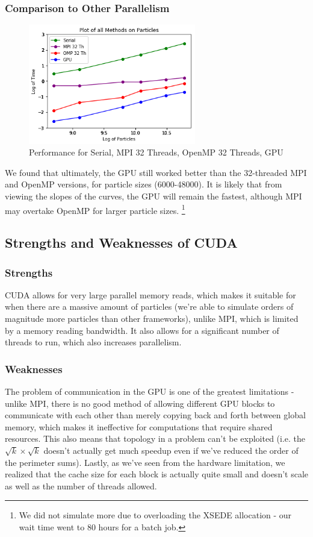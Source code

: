\documentclass[12pt]{article}
\begin{document}
\subsubsection{Comparison to Other Parallelism}

\begin{figure}[h]
  \caption{Performance for Serial, MPI 32 Threads, OpenMP 32 Threads, GPU}
  \centering 
  \includegraphics[width = 0.65\textwidth]{serial_mpi_openmp_gpu.png}
\end{figure}
We found that ultimately, the GPU still worked better than the 32-threaded MPI and OpenMP versions, for particle sizes (6000-48000). It is likely that from viewing the slopes of the curves, the GPU will remain the fastest, although MPI may overtake OpenMP for larger particle sizes. \footnote{We did not simulate more due to overloading the XSEDE allocation - our wait time went to 80 hours for a batch job.}

\subsection{Strengths and Weaknesses of CUDA}
\subsubsection{Strengths}
CUDA allows for very large parallel memory reads, which makes it suitable for when there are a massive amount of particles (we're able to simulate orders of magnitude more particles than other frameworks), unlike MPI, which is limited by a memory reading bandwidth. It also allows for a significant number of threads to run, which also increases parallelism. 


\subsubsection{Weaknesses}
The problem of communication in the GPU is one of the greatest limitations - unlike MPI, there is no good method of allowing different GPU blocks to communicate with each other than merely copying back and forth between global memory, which makes it ineffective for computations that require shared resources. This also means that topology in a problem can't be exploited (i.e. the $\sqrt{k} \times \sqrt{k}$ doesn't actually get much speedup even if we've reduced the order of the perimeter sums). Lastly, as we've seen from the hardware limitation, we realized that the cache size for each block is actually quite small and doesn't scale as well as the number of threads allowed.
\end{document}
